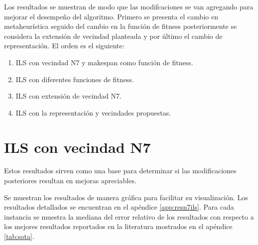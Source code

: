 Los resultados se muestran de modo que las modifcaciones se van agregando para mejorar el desempeño del algoritmo. Primero se presenta el cambio en metaheurística seguido del cambio en la función de fitness posteriormente se considera la extensión de vecindad planteada y por último el cambio de representación. El orden es el siguiente:
\begin{enumerate}
    \item ILS con vecindad N7 y makespan como función de fitness.
    \item ILS con diferentes funciones de fitness.
    \item ILS con extensión de vecindad N7.
    \item ILS con la representación y vecindades propuestas.
\end{enumerate}
\section{ILS con vecindad N7}
Estos resultados sirven como una base para determinar si las modificaciones posteriores resultan en mejoras apreciables.

Se muestran los resultados de manera gráfica para facilitar su visualización. Los resultados detallados se encuentran en el apéndice \ref{app:resn7ils}. Para cada instancia se muestra la mediana del error relativo de los resultados con respecto a los mejores resultados reportados en la literatura mostrados en el apéndice \ref{tab:sota}. 

